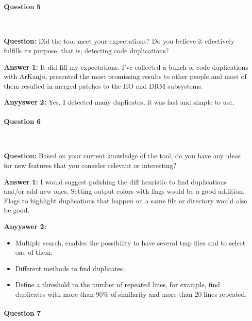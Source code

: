 \paragraph{Question 5}

\

\textbf{Question:} Did the tool meet your expectations? Do you believe it effectively 
fulfills its purpose, that is, detecting code duplications?

\textbf{Answer 1:} It did fill my expectations. I've collected a bunch of code duplications with ArKanjo,
presented the most promissing results to other people and most of them resulted in merged patches to the 
IIO and DRM subsystems.

\textbf{Anyyswer 2:} Yes, I detected many duplicates, it was fast and simple to use.

\paragraph{Question 6}

\

\textbf{Question:} Based on your current knowledge of the tool, do you have any ideas 
for new features that you consider relevant or interesting?

\textbf{Answer 1:} I would suggest polishing the diff heuristic to find duplications and/or add new ones. 
Setting output colors with flags would be a good addition. Flags to highlight duplications that happen on 
a same file or directory would also be good.

\textbf{Anyyswer 2:} 

\begin{itemize}

\item Multiple search, enables the possibility to have several tmp files and to select one
of them.

\item Different methods to find duplicates.

\item Define a threshold to the number of repeated lines, for example, find duplicates
with more than 90\% of similarity and more than 20 lines repeated.

\end{itemize}

\paragraph{Question 7}

